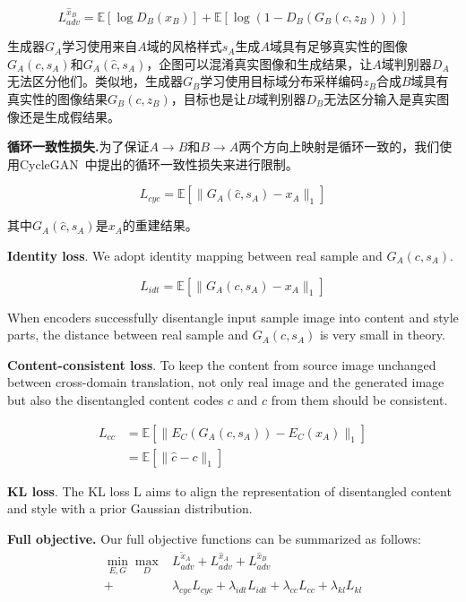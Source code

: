 \begin{equation}
\label{equ:adv_b}
L_{adv}^{\hat{x}_B} = \mathbb{E}[\log D_B(x_B)] + \mathbb{E}[\log(1-D_B(G_B(c,z_B)))]
\end{equation}

生成器$G_A$学习使用来自$A$域的风格样式$s_A$生成$A$域具有足够真实性的图像$G_A(c,s_A)$和$G_A(\hat{c},s_A)$，企图可以混淆真实图像和生成结果，让$A$域判别器$D_A$无法区分他们。类似地，生成器$G_B$学习使用目标域分布采样编码$z_B$合成$B$域具有真实性的图像结果$G_B(c,z_B)$，目标也是让$B$域判别器$D_B$无法区分输入是真实图像还是生成假结果。

\textbf{循环一致性损失.}为了保证$A \rightarrow B$和$B \rightarrow A$两个方向上映射是循环一致的，我们使用CycleGAN~\cite{zhu2017unpaired}中提出的循环一致性损失来进行限制。

\begin{equation}
\label{equ:cycle}
L_{cyc} = \mathbb{E}[\| G_A(\hat{c}, s_A) - x_A \|_1]
\end{equation}

其中$G_A(\hat{c}, s_A)$是$x_A$的重建结果。

\textbf{Identity loss}. We adopt identity mapping between real sample and $G_A(c,s_A)$. 

\begin{equation}
\label{equ:idt}
L_{idt} = \mathbb{E}[\| G_A(c, s_A) - x_A \|_1]
\end{equation}

When encoders successfully disentangle input sample image into content and style parts, the distance between real sample and $G_A(c,s_A)$ is very small in theory.

\textbf{Content-consistent loss}.
To keep the content from source image unchanged between cross-domain translation, not only real image and the generated image but also the disentangled content codes $c$ and $\hat{c}$ from them should be consistent.

\begin{equation}
\label{equ:cc}
\begin{aligned}
L_{cc} & = \mathbb{E}[\| E_C(G_A(c, s_A)) - E_C(x_A) \|_1] \\
       & = \mathbb{E}[\| \hat{c} - c \|_1]
\end{aligned}
\end{equation}

\textbf{KL loss}. The KL loss L aims to align the representation of disentangled content and style with a prior Gaussian distribution.

\textbf{Full objective.}
Our full objective functions can be summarized as follows:
\begin{equation}
\label{equ:full}
\begin{aligned}
\min_{E,G}\max_{D} & L_{adv}^{\tilde{x}_A}+L_{adv}^{\hat{x}_A}+L_{adv}^{\hat{x}_B} \\
+&\lambda_{cyc}L_{cyc}+\lambda_{idt}L_{idt}+\lambda_{cc}L_{cc}+\lambda_{kl}L_{kl}
\end{aligned}
\end{equation}


